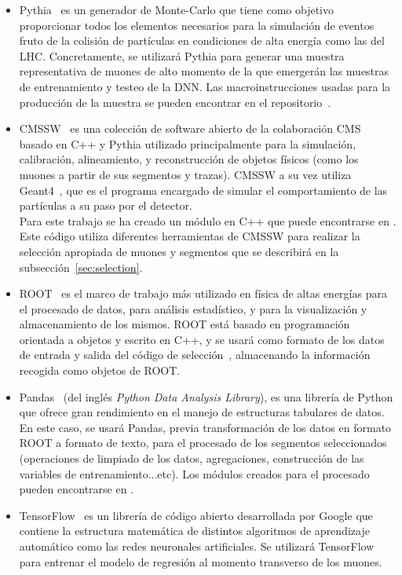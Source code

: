 \begin{itemize}

\item Pythia~\cite{Sjstrand2008ABI} es un generador de Monte-Carlo que tiene como objetivo proporcionar todos los elementos necesarios para la simulaci\'on de eventos fruto de la colisi\'on de part\'iculas en condiciones de alta energ\'ia como las del LHC. Concretamente, se utilizar\'a Pythia para generar una muestra representativa de muones de alto momento de la que emerger\'an las muestras de entrenamiento y testeo de la DNN. Las macroinstrucciones usadas para la producci\'on de la muestra se pueden encontrar en el repositorio~\cite{generator}.

\item CMSSW~\cite{cmssw} es una colecci\'on de software abierto de la colaboraci\'on CMS basado en C++ y Pythia utilizado principalmente para la simulaci\'on, calibraci\'on, alineamiento, y reconstrucci\'on de objetos f\'isicos (como los muones a partir de sus segmentos y trazas). CMSSW a su vez utiliza Geant4~\cite{Agostinelli:2002hh}, que es el programa encargado de simular el comportamiento de las partículas a su paso por el detector. \\
Para este trabajo se ha creado un m\'odulo en C++ que puede encontrarse en \cite{analyzer}. Este c\'odigo utiliza diferentes herramientas de CMSSW para realizar la selecci\'on apropiada de muones y segmentos que se describir\'a en la subsecci\'on~\ref{sec:selection}. 

\item ROOT~\cite{root} es el marco de trabajo m\'as utilizado en f\'isica de altas energ\'ias para el procesado de datos, para an\'alisis estad\'istico, y para la visualizaci\'on y almacenamiento de los mismos. ROOT est\'a basado en programaci\'on orientada a objetos y escrito en C++, y se usar\'a como formato de los datos de entrada y salida del c\'odigo de selecci\'on~\cite{analyzer}, almacenando la informaci\'on recogida como objetos de ROOT.

\item Pandas~\cite{mckinney-proc-scipy-2010} (del ingl\'es \textit{Python Data Analysis Library}), es una librer\'ia de Python que ofrece gran rendimiento en el manejo de estructuras tabulares de datos. En este caso, se usar\'a Pandas, previa transformaci\'on de los datos en formato ROOT a formato de texto, para el procesado de los segmentos seleccionados (operaciones de limpiado de los datos, agregaciones, construcci\'on de las variables de entrenamiento...etc). Los m\'odulos creados para el procesado pueden encontrarse en \cite{processor}.

\item TensorFlow~\cite{tensorflow2015-whitepaper} es un librer\'ia de c\'odigo abierto desarrollada por Google que contiene la estructura matem\'atica de distintos algoritmos de aprendizaje autom\'atico como las redes neuronales artificiales. Se utilizar\'a TensorFlow para entrenar el modelo de regresi\'on al momento transverso de los muones.

\end{itemize}


